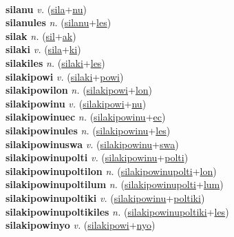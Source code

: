  \label{silalon} \\
\textbf{silanu} \textit{v.} (\hyperref[sila]{sila}+\hyperref[nu]{nu})
 \label{silanu} \\
\textbf{silanules} \textit{n.} (\hyperref[silanu]{silanu}+\hyperref[les]{les})
 \label{silanules} \\
\textbf{silak} \textit{n.} (\hyperref[sil]{sil}+\hyperref[ak]{ak})
 \label{silak} \\
\textbf{silaki} \textit{v.} (\hyperref[sila]{sila}+\hyperref[ki]{ki})
 \label{silaki} \\
\textbf{silakiles} \textit{n.} (\hyperref[silaki]{silaki}+\hyperref[les]{les})
 \label{silakiles} \\
\textbf{silakipowi} \textit{v.} (\hyperref[silaki]{silaki}+\hyperref[powi]{powi})
 \label{silakipowi} \\
\textbf{silakipowilon} \textit{n.} (\hyperref[silakipowi]{silakipowi}+\hyperref[lon]{lon})
 \label{silakipowilon} \\
\textbf{silakipowinu} \textit{v.} (\hyperref[silakipowi]{silakipowi}+\hyperref[nu]{nu})
 \label{silakipowinu} \\
\textbf{silakipowinuec} \textit{n.} (\hyperref[silakipowinu]{silakipowinu}+\hyperref[ec]{ec})
 \label{silakipowinuec} \\
\textbf{silakipowinules} \textit{n.} (\hyperref[silakipowinu]{silakipowinu}+\hyperref[les]{les})
 \label{silakipowinules} \\
\textbf{silakipowinuswa} \textit{v.} (\hyperref[silakipowinu]{silakipowinu}+\hyperref[swa]{swa})
 \label{silakipowinuswa} \\
\textbf{silakipowinupolti} \textit{v.} (\hyperref[silakipowinu]{silakipowinu}+\hyperref[polti]{polti})
 \label{silakipowinupolti} \\
\textbf{silakipowinupoltilon} \textit{n.} (\hyperref[silakipowinupolti]{silakipowinupolti}+\hyperref[lon]{lon})
 \label{silakipowinupoltilon} \\
\textbf{silakipowinupoltilum} \textit{n.} (\hyperref[silakipowinupolti]{silakipowinupolti}+\hyperref[lum]{lum})
 \label{silakipowinupoltilum} \\
\textbf{silakipowinupoltiki} \textit{v.} (\hyperref[silakipowinu]{silakipowinu}+\hyperref[poltiki]{poltiki})
 \label{silakipowinupoltiki} \\
\textbf{silakipowinupoltikiles} \textit{n.} (\hyperref[silakipowinupoltiki]{silakipowinupoltiki}+\hyperref[les]{les})
 \label{silakipowinupoltikiles} \\
\textbf{silakipowinyo} \textit{v.} (\hyperref[silakipowi]{silakipowi}+\hyperref[nyo]{nyo})

